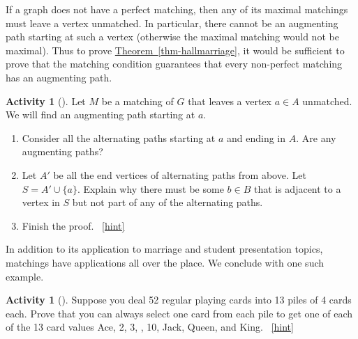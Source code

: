 \documentclass[10pt,]{book}
\theoremstyle{plain}
\theoremstyle{definition}
\theoremstyle{definition}
\theoremstyle{definition}
\newtheorem{activity}[project]{Activity}
\numberwithin{equation}{chapter}
\begin{document}
\hypertarget{p-1712}{}%
If a graph does not have a perfect matching, then any of its maximal matchings must leave a vertex unmatched.  In particular, there cannot be an augmenting path starting at such a vertex (otherwise the maximal matching would not be maximal).  Thus to prove \hyperref[thm-hallmarriage]{Theorem~\ref{thm-hallmarriage}}, it would be sufficient to prove that the matching condition guarantees that every non-perfect matching has an augmenting path.%
\begin{activity}[]\label{activity-318}
\hypertarget{p-1713}{}%
Let \(M\) be a matching of \(G\) that leaves a vertex \(a \in A\) unmatched.  We will find an augmenting path starting at \(a\).%
\begin{enumerate}[font=\bfseries,label=(\alph*),ref=\alph*]
\item\label{task-286} \hypertarget{p-1714}{}%
Consider all the alternating paths starting at \(a\) and ending in \(A\).  Are any augmenting paths?%
\item\label{task-287} \hypertarget{p-1715}{}%
Let \(A'\) be all the end vertices of alternating paths from above.  Let \(S = A' \cup \{a\}\).  Explain why there must be some \(b \in B\) that is adjacent to a vertex in \(S\) but not part of any of the alternating paths.%
\item\label{task-288} \hypertarget{p-1716}{}%
Finish the proof.%
~\hfill{\tiny\hyperlink{a-325.c}{[hint]}\hypertarget{q-325.c}{}}\end{enumerate}
\end{activity}
\hypertarget{p-1718}{}%
In addition to its application to marriage and student presentation topics, matchings have applications all over the place. We conclude with one such example.%
\begin{activity}[]\label{activity-319}
\hypertarget{p-1719}{}%
Suppose you deal 52 regular playing cards into 13 piles of 4 cards each. Prove that you can always select one card from each pile to get one of each of the 13 card values Ace, 2, 3, \textellipsis{}, 10, Jack, Queen, and King.%
~\hfill{\tiny\hyperlink{a-326}{[hint]}\hypertarget{q-326}{}}\end{activity}
\end{document}
